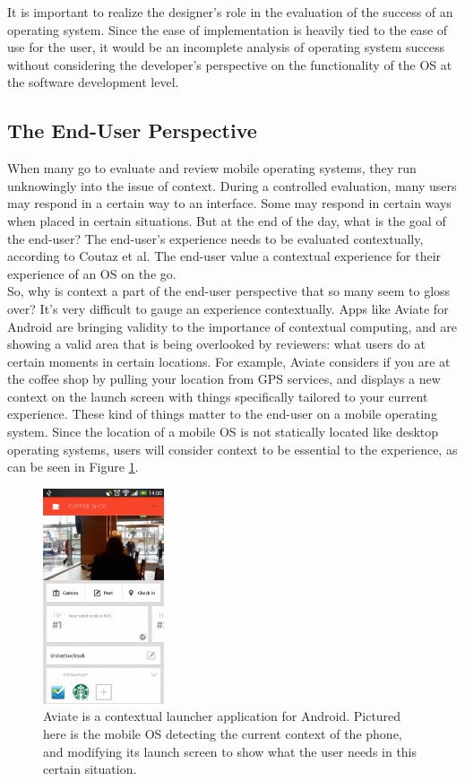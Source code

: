 \documentclass[11pt]{article}
\begin{document}
It is important to realize the designer's role in the evaluation of the success of an operating system. Since the ease of implementation is heavily tied to the ease of use for the user, it would be an incomplete analysis of operating system success without considering the developer's perspective on the functionality of the OS at the software development level.

\subsection{The End-User Perspective}
When many go to evaluate and review mobile operating systems, they run unknowingly into the issue of context. During a controlled evaluation, many users may respond in a certain way to an interface. Some may respond in certain ways when placed in certain situations. But at the end of the day, what is the goal of the end-user? The end-user's experience needs to be evaluated contextually, according to Coutaz et al. The end-user value a contextual experience for their experience of an OS on the go. \cite{Coutaz} \\
\indent So, why is context a part of the end-user perspective that so many seem to gloss over? It's very difficult to gauge an experience contextually. Apps like Aviate for Android are bringing validity to the importance of contextual computing, and are showing a valid area that is being overlooked by reviewers: what users do at certain moments in certain locations. For example, Aviate considers if you are at the coffee shop by pulling your location from GPS services, and displays a new context on the launch screen with things specifically tailored to your current experience. \cite{Aviate} These kind of things matter to the end-user on a mobile operating system. Since the location of a mobile OS is not statically located like desktop operating systems, users will consider context to be essential to the experience, as can be seen in Figure \ref{aviate}.

\begin{figure}[h]
\begin{center}
\includegraphics[height = 2.5in]{aviate}
\caption{Aviate is a contextual launcher application for Android. Pictured here is the mobile OS detecting the current context of the phone, and modifying its launch screen to show what the user needs in this certain situation. \cite{Aviate}}
\label{aviate}
\end{center}
\end{figure}
\end{document}
